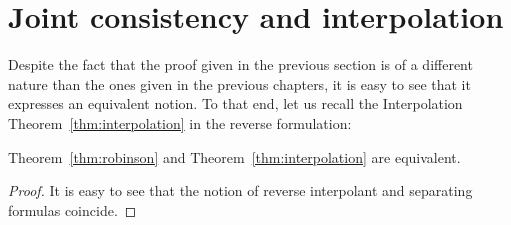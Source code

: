 \section{Joint consistency and interpolation}

Despite the fact that the proof given in the previous section is of a different nature than the ones given in the previous chapters, it is easy to see that it expresses an equivalent notion.
To that end, let us recall the Interpolation Theorem~\ref{thm:interpolation} in the reverse formulation:

\interpolationRevThm*

\begin{prop}
	Theorem~\ref{thm:robinson} and Theorem~\ref{thm:interpolation} are equivalent.
\end{prop}
\begin{proof}
	It is easy to see that the notion of reverse interpolant and separating formulas coincide.
\end{proof}





